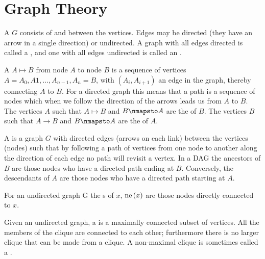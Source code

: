 \chapter{Graph Theory}

\begin{defi}[Graph]
A  $G$ consists of  and  between the vertices. Edges may be directed (they have an arrow in a single direction) or undirected. A graph with all edges directed is called a , and one with all edges undirected is called an .
\cite{Barber2011}
\end{defi}

\begin{defi}
A  $A\mapsto B$ from node $A$ to node $B$ is a sequence of vertices $A=A_0,A1,\ldots,A_{n-1},A_n=B$, with $\left(A_i,A_{i+1}\right)$ an edge in the graph, thereby connecting $A$ to $B$. For a directed graph this means that a path is a sequence of nodes which when we follow the direction of the arrows leads us from $A$ to $B$. The vertices $A$ such that $A\mapsto B$ and $B\nmapsto A$ are the  of $B$. The vertices $B$ such that $A → B$ and $B\nmapsto A$ are the  of $A$.
\cite{Barber2011}
\end{defi}

\begin{defi}
A  is a graph $G$ with directed edges (arrows on each link) between the vertices (nodes) such that by following a path of vertices from one node to another along the direction of each edge no path will revisit a vertex. In a DAG the ancestors of $B$ are those nodes who have a directed path ending at $B$. Conversely, the descendants of $A$ are those nodes who have a directed path starting at $A$.
\cite{Barber2011}
\end{defi}

\begin{defi}[Neighbour]
For an undirected graph G the s of $x$, $\mbox{ne}\left(x\right)$ are those nodes directly connected to $x$.
\cite{Barber2011}
\end{defi}

\begin{defi}
Given an undirected graph, a  is a maximally connected subset of vertices. All the members of the clique are connected to each other; furthermore there is no larger clique that can be made from a clique. A non-maximal clique is sometimes called a .
\cite{Barber2011}
\end{defi}

